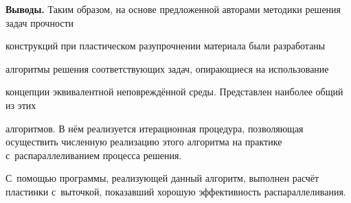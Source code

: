 




\smallskip



{\bf Выводы.} Таким образом, на основе предложенной авторами методики решения задач прочности

конструкций при пластическом разупрочнении материала были разработаны

алгоритмы решения соответствующих задач, опирающиеся на использование

концепции эквивалентной неповреждённой среды. Представлен наиболее общий из этих

алгоритмов. В нём реализуется итерационная процедура, позволяющая осуществить численную реализацию этого алгоритма на практике с~распараллеливанием процесса решения. 

С~помощью программы, реализующей данный алгоритм, выполнен расчёт пластинки с~выточкой, показавший хорошую эффективность распараллеливания.



\newpage



